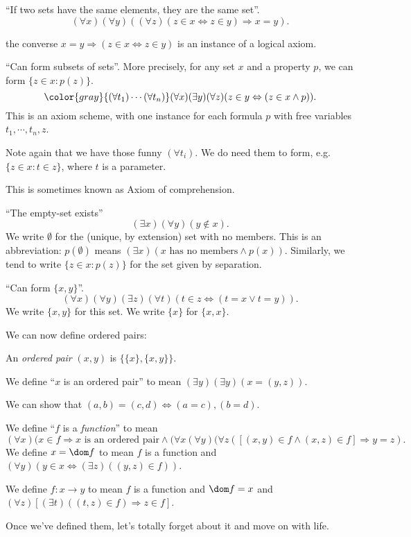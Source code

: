 \documentclass[a4paper]{article}
\begin{document}
\begin{axiom}
  ``If two sets have the same elements, they are the same set''.
  \[
    (\forall x)(\forall y)((\forall z)(z\in x\Leftrightarrow z\in y) \Rightarrow  x = y).
  \]
\end{axiom}
\note the converse $x = y \Rightarrow  (z\in x \Leftrightarrow z\in y)$ is an instance of a logical axiom.
\begin{axiom}
  ``Can form subsets of sets''. More precisely, for any set $x$ and a property $p$, we can form $\{z\in x: p(z)\}$.
  \[
    {\color{gray}{(\forall t_1)\cdots(\forall t_n)}}(\forall x)(\exists y)(\forall z)(z\in y \Leftrightarrow (z\in x\wedge p)).
  \]
  This is an axiom scheme, with one instance for each formula $p$ with free variables $t_1, \cdots, t_n, z$.

  Note again that we have those funny $(\forall t_i)$. We do need them to form, e.g. $\{z\in x: t\in z\}$, where $t$ is a parameter.

  This is sometimes known as Axiom of comprehension.
\end{axiom}
\begin{axiom}
  ``The empty-set exists''
  \[
    (\exists x)(\forall y)(y\not\in x).
  \]
  We write $\emptyset$ for the (unique, by extension) set with no members. This is an abbreviation: $p(\emptyset)$ means $(\exists x)(x\text{ has no members}\wedge p(x))$. Similarly, we tend to write $\{z\in x: p(z)\}$ for the set given by separation.
\end{axiom}
\begin{axiom}
  ``Can form $\{x, y\}$''.
  \[
    (\forall x)(\forall y)(\exists z)(\forall t)(t\in z \Leftrightarrow (t= x\vee t  = y)).
  \]
  We write $\{x, y\}$ for this set. We write $\{x\}$ for $\{x, x\}$.
\end{axiom}

We can now define ordered pairs:
\begin{defi}
  An \emph{ordered pair} $(x, y)$ is $\{\{x\}, \{x, y\}\}$.

  We define ``$x$ is an ordered pair'' to mean $(\exists y)(\exists y)(x = (y, z))$.
\end{defi}
We can show that $(a, b) = (c, d) \Leftrightarrow (a = c), (b = d)$.

\begin{defi}[Function]
  We define ``$f$ is a \emph{function}'' to mean
  \[
    (\forall x)(x\in f\Rightarrow x\text{ is an ordered pair}\wedge (\forall x(\forall y)(\forall z([(x, y)\in f \wedge (x, z)\in f]\Rightarrow y = z).
  \]
  We define $x = \dom  f$ to mean $f$ is a function and $(\forall y)(y\in x \Leftrightarrow (\exists z)((y, z)\in f))$.

  We define $f: x\to y$ to mean $f$ is a function and $\dom f = x$ and $(\forall z)[(\exists t)((t, z)\in f)\Rightarrow z\in f]$.
\end{defi}
Once we've defined them, let's totally forget about it and move on with life.
\end{document}

